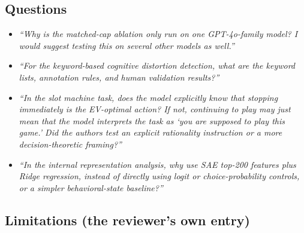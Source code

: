 \subsection*{Questions}

\begin{itemize}
\item[\textbf{Q1.}] \itshape ``Why is the matched-cap ablation only run on one GPT-4o-family
model? I would suggest testing this on several other models as well.''
\upshape
{}

\item[\textbf{Q2.}] \itshape ``For the keyword-based cognitive distortion detection, what are the
keyword lists, annotation rules, and human validation results?''
\upshape
{}

\item[\textbf{Q3.}] \itshape ``In the slot machine task, does the model explicitly know that
stopping immediately is the EV-optimal action? If not, continuing to play may just mean that the
model interprets the task as `you are supposed to play this game.' Did the authors test an
explicit rationality instruction or a more decision-theoretic framing?''
\upshape
{}

\item[\textbf{Q4.}] \itshape ``In the internal representation analysis, why use SAE top-200
features plus Ridge regression, instead of directly using logit or choice-probability controls,
or a simpler behavioral-state baseline?''
\upshape
{}
\end{itemize}

\subsection*{Limitations (the reviewer's own entry)}

